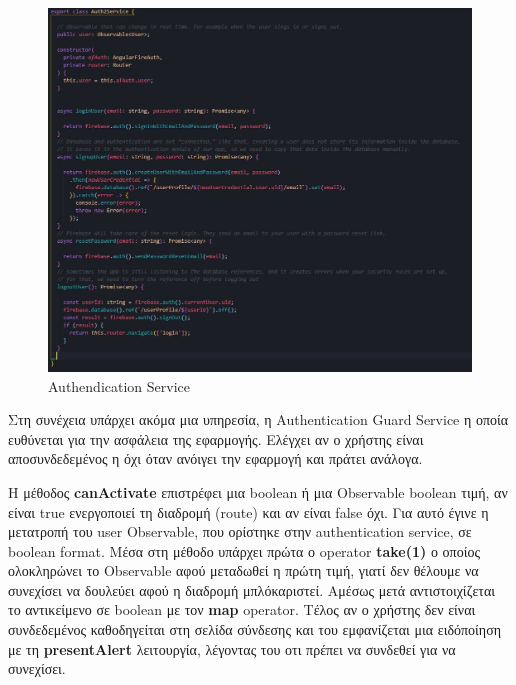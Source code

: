 \documentclass[a4paper,12pt]{article}
\begin{document}
			\begin{figure}[!htb]
				\begin{center}
					\caption{Authendication Service}
					\vspace*{0.5cm}

					\includegraphics[width=0.9\linewidth]{authService} 
				\end{center}
			\end{figure}

			\newpage
			Στη συνέχεια υπάρχει ακόμα μια υπηρεσία, η Authentication Guard Service η οποία ευθύνεται για την ασφάλεια της εφαρμογής. Ελέγχει αν ο χρήστης είναι αποσυνδεδεμένος η όχι όταν ανόιγει την εφαρμογή και πράτει ανάλογα.

			Η μέθοδος \textbf{canActivate} επιστρέφει μια boolean ή μια Observable boolean τιμή, αν είναι true ενεργοποιεί τη 
			διαδρομή (route) και αν είναι false όχι. Για αυτό έγινε η μετατροπή του user Observable, που ορίστηκε στην authentication service, σε boolean format.
			Μέσα στη μέθοδο υπάρχει πρώτα ο operator \textbf{take(1)} ο οποίος ολοκληρώνει το Observable αφού μεταδωθεί η πρώτη τιμή, γιατί δεν θέλουμε να συνεχίσει να δουλεύει 
			αφού η διαδρομή μπλόκαριστεί. Αμέσως μετά αντιστοιχίζεται το αντικείμενο σε boolean με τον \textbf{map} operator. Τέλος αν ο χρήστης δεν είναι συνδεδεμένος 
			καθοδηγείται στη σελίδα σύνδεσης και του εμφανίζεται μια ειδόποίηση με τη \textbf{presentAlert} λειτουργία, λέγοντας του οτι πρέπει να συνδεθεί για να συνεχίσει.
\end{document}
